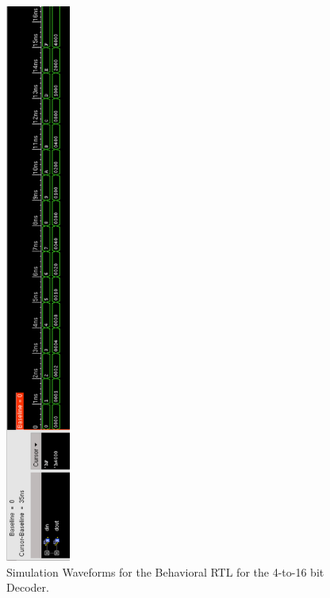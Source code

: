 \documentclass[ee577b,acmnow]{acmtrans2m}
\begin{document}
\hspace{-2cm}\begin{figure}
\begin{center}
\includegraphics[height=18.5cm]{predec4to16}
\caption{Simulation Waveforms for the Behavioral RTL for the 4-to-16 bit Decoder.}
\label{predecoder4to16}
\end{center}
\end{figure}
\end{document}
